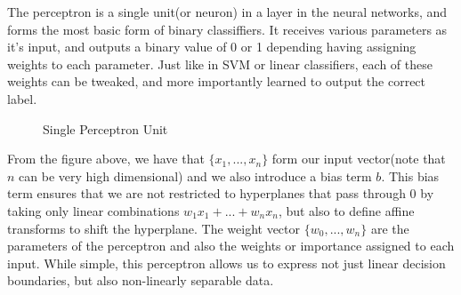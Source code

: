 \documentclass[12pt]{article}
\begin{document}
The perceptron is a single unit(or neuron) in a layer in the neural networks, and forms the most basic form of binary classiffiers. It receives various parameters as it's input, and outputs a binary value of 0 or 1 depending having assigning weights to each parameter. Just like in SVM or linear classifiers, each of these weights can be tweaked, and more importantly learned to output the correct label.

\begin{figure}[!htb]
\centering
\caption{Single Perceptron Unit}
\end{figure}

From the figure above, we have that $\{x_1,...,x_n\}$ form our input vector(note that $n$ can be very high dimensional) and we also introduce a bias term $b$. This bias term ensures that we are not restricted to hyperplanes that pass through 0 by taking only linear combinations $w_1x_1 +...+ w_nx_n$, but also to define affine transforms to shift the hyperplane. The weight vector $\{w_0, ..., w_n\}$ are the parameters of the perceptron and also the weights or importance assigned to each input. While simple, this perceptron allows us to express not just linear decision boundaries, but also non-linearly separable data.\\
\end{document}
